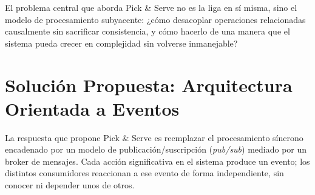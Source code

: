 \documentclass[12pt, a4paper]{article}
\begin{document}
El problema central que aborda Pick \& Serve no es la liga en sí misma, sino el modelo de procesamiento subyacente: ¿cómo desacoplar operaciones relacionadas causalmente sin sacrificar consistencia, y cómo hacerlo de una manera que el sistema pueda crecer en complejidad sin volverse inmanejable?

\section{Solución Propuesta: Arquitectura Orientada a Eventos}

La respuesta que propone Pick \& Serve es reemplazar el procesamiento síncrono encadenado por un modelo de publicación/suscripción (\textit{pub/sub}) mediado por un broker de mensajes. Cada acción significativa en el sistema produce un evento; los distintos consumidores reaccionan a ese evento de forma independiente, sin conocer ni depender unos de otros.
\end{document}
